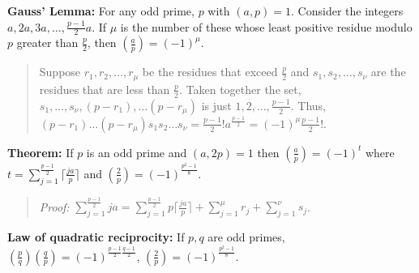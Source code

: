 {\bf Gauss' Lemma:} 
For any odd prime, $p$ with $(a,p)=1$.  Consider the integers
$a, 2a, 3a, \ldots, {\frac {p-1} 2}a$.  If $\mu$ is the number of
these whose least positive residue modulo $p$ greater than ${\frac p 2}$,
then $({\frac a p})= (-1)^{\mu}$.
\begin{quote}
Suppose $r_1 , r_2 , \ldots , r_{\mu}$ be the residues that exceed ${\frac p 2}$
and $s_1, s_2 , \ldots , s_{\nu}$ are the residues that are less
than ${\frac p 2}$.  Taken together the set, $s_1, \ldots, s_{\nu},
(p-r_1), \ldots (p-r_{\mu})$ is just
$1, 2, \ldots , {\frac {p-1} 2}$.  Thus,
$(p-r_1 ) \ldots (p-r_{\mu})s_1 s_2 \ldots s_{\nu} =
{\frac {p-1} 2}! a^{\frac {p-1} 2} = (-1)^{\mu} {\frac {p-1} 2}!$.
\end{quote}
{\bf Theorem:} 
If $p$ is an odd prime and $(a,2p)=1$ then $({\frac a p}) = (-1)^t$ where
$t= \sum_{j=1}^{\frac {p-1} 2} \lceil {\frac {ja} p} \rceil$ and $({\frac 2 p})=
(-1)^{\frac {p^2 -1} 8}$.
\begin{quote}
\emph{Proof:}
$\sum_{j=1}^{\frac {p-1} 2} ja =
\sum_{j=1}^{\frac {p-1} 2} p \lceil {\frac {ja} p} \rceil + \sum_{j=1}^{\mu} r_j +
\sum_{j=1}^{\nu} s_j$.
\end{quote}
{\bf Law of quadratic reciprocity:} If $p, q$ are odd primes,
$({\frac {p} {q}}) ({\frac {q} {p}})
= (-1)^{\frac {p-1} {2} \frac {q-1} {2}}$,
$({\frac {2} {p}}) = (-1)^{\frac {p^2 - 1} 8}$.
